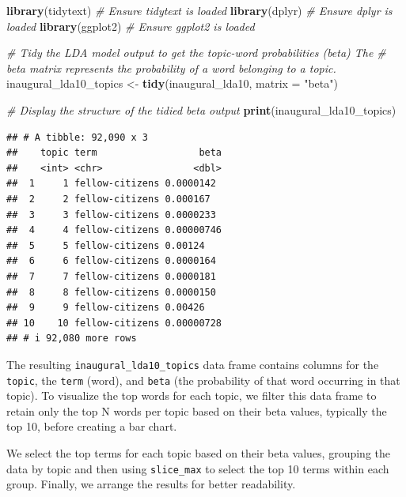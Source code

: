\documentclass[
]{book}
\newenvironment{Shaded}{\begin{snugshade}}{\end{snugshade}}
\newcommand{\AttributeTok}[1]{\textcolor[rgb]{0.13,0.29,0.53}{#1}}
\newcommand{\CommentTok}[1]{\textcolor[rgb]{0.56,0.35,0.01}{\textit{#1}}}
\newcommand{\FunctionTok}[1]{\textcolor[rgb]{0.13,0.29,0.53}{\textbf{#1}}}
\newcommand{\NormalTok}[1]{#1}
\newcommand{\OtherTok}[1]{\textcolor[rgb]{0.56,0.35,0.01}{#1}}
\newcommand{\StringTok}[1]{\textcolor[rgb]{0.31,0.60,0.02}{#1}}
\begin{document}
\begin{Shaded}
\begin{Highlighting}[]
\FunctionTok{library}\NormalTok{(tidytext)  }\CommentTok{\# Ensure tidytext is loaded}
\FunctionTok{library}\NormalTok{(dplyr)  }\CommentTok{\# Ensure dplyr is loaded}
\FunctionTok{library}\NormalTok{(ggplot2)  }\CommentTok{\# Ensure ggplot2 is loaded}

\CommentTok{\# Tidy the LDA model output to get the topic{-}word probabilities (beta) The}
\CommentTok{\# \textquotesingle{}beta\textquotesingle{} matrix represents the probability of a word belonging to a topic.}
\NormalTok{inaugural\_lda10\_topics }\OtherTok{\textless{}{-}} \FunctionTok{tidy}\NormalTok{(inaugural\_lda10, }\AttributeTok{matrix =} \StringTok{"beta"}\NormalTok{)}

\CommentTok{\# Display the structure of the tidied beta output}
\FunctionTok{print}\NormalTok{(inaugural\_lda10\_topics)}
\end{Highlighting}
\end{Shaded}

\begin{verbatim}
## # A tibble: 92,090 x 3
##    topic term                  beta
##    <int> <chr>                <dbl>
##  1     1 fellow-citizens 0.0000142 
##  2     2 fellow-citizens 0.000167  
##  3     3 fellow-citizens 0.0000233 
##  4     4 fellow-citizens 0.00000746
##  5     5 fellow-citizens 0.00124   
##  6     6 fellow-citizens 0.0000164 
##  7     7 fellow-citizens 0.0000181 
##  8     8 fellow-citizens 0.0000150 
##  9     9 fellow-citizens 0.00426   
## 10    10 fellow-citizens 0.00000728
## # i 92,080 more rows
\end{verbatim}

The resulting \texttt{inaugural\_lda10\_topics} data frame contains columns for the \texttt{topic}, the \texttt{term} (word), and \texttt{beta} (the probability of that word occurring in that topic).
To visualize the top words for each topic, we filter this data frame to retain only the top N words per topic based on their beta values, typically the top 10, before creating a bar chart.

We select the top terms for each topic based on their beta values, grouping the data by topic and then using \texttt{slice\_max} to select the top 10 terms within each group.
Finally, we arrange the results for better readability.
\end{document}
